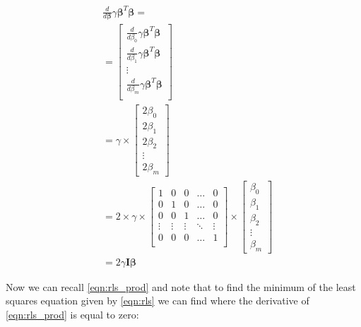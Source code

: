 \documentclass{article}
\newcommand{\B}{\boldsymbol\beta} %
\newcommand{\I}{\mathbf{I}}
\begin{document}
\begin{equation}
\begin{split}
    & \frac{d}{d\B} \gamma \B^T \B = \\
    & =
    \begin{bmatrix}
        \frac{d}{d \beta_0} \gamma \B^T \B \\
        \frac{d}{d \beta_1} \gamma \B^T \B \\
        \vdots \\
        \frac{d}{d \beta_m} \gamma \B^T \B \\
    \end{bmatrix}\\
    &= \gamma \times
    \begin{bmatrix}
        2 \beta_0 \\
        2 \beta_1 \\
        2 \beta_2 \\
        \vdots \\
        2 \beta_m
    \end{bmatrix}\\
    &= 2 \times \gamma \times
    \begin{bmatrix}
        1 & 0 & 0 & \ldots & 0\\
        0 & 1 & 0 & \ldots & 0\\
        0 & 0 & 1 & \ldots & 0\\
        \vdots & \vdots & \vdots & \ddots & \vdots \\
        0 & 0 & 0 & \ldots & 1\\
    \end{bmatrix}
    \times
    \begin{bmatrix}
        \beta_0 \\
        \beta_1 \\
        \beta_2 \\
        \vdots \\
        \beta_m
    \end{bmatrix}\\
    &= 2 \gamma \I \B
\end{split}
\end{equation}

Now we can recall \ref{eqn:rls_prod} and note that to find the minimum of the least squares equation given by \ref{eqn:rls} we can find where the derivative of \ref{eqn:rls_prod} is equal to zero:
\end{document}
